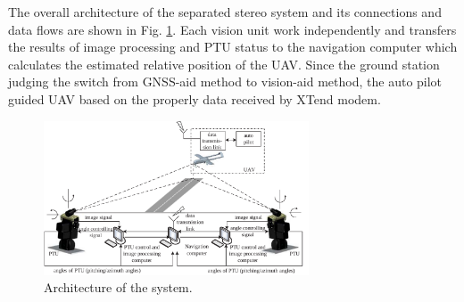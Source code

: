 
The overall architecture of the separated stereo system and its connections and data flows are shown in Fig. \ref{fig:SystemStructure}. Each vision unit work independently and transfers the results of image processing and PTU status to the navigation computer which calculates the estimated relative position of the UAV. Since the ground station judging the switch from GNSS-aid method to vision-aid method, the auto pilot guided UAV based on the properly data received by XTend modem. 

\begin{figure}[!tb]
	\centering
	\includegraphics[width=0.7\textwidth]{Figs/SystemStructure.pdf}
	\caption{Architecture of the system.}
	\label{fig:SystemStructure}
\end{figure}




